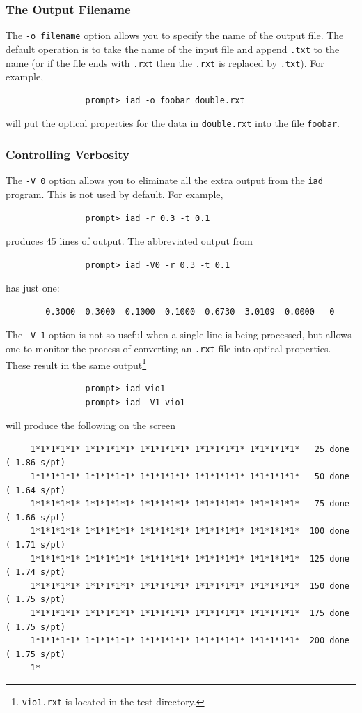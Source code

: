 \documentclass{article}
\newcommand\iadprog{\texttt{iad}}
\begin{document}
\subsubsection{The Output Filename}

The \texttt{-o filename} option allows you to specify the name of the output
file.  The default operation is to take the name of the input file and append
\texttt{.txt} to the name (or if the file ends with \texttt{.rxt} then
the \texttt{.rxt} is replaced by \texttt{.txt}).  For example,
\begin{verbatim}
                prompt> iad -o foobar double.rxt
\end{verbatim}
will put the optical properties for the data in \texttt{double.rxt}
 into the file \texttt{foobar}.

\subsubsection{Controlling Verbosity}

The \texttt{-V 0} option allows you to eliminate all the extra output from
the \iadprog{} program.  This is not used by default. For example,
\begin{verbatim}
                prompt> iad -r 0.3 -t 0.1
\end{verbatim}
produces 45 lines of output.  The abbreviated output from
\begin{verbatim}
                prompt> iad -V0 -r 0.3 -t 0.1
\end{verbatim}
has just one:
\begin{verbatim}
        0.3000  0.3000  0.1000  0.1000  0.6730  3.0109  0.0000   0
\end{verbatim}

The \texttt{-V 1} option is not so useful when a single line
is being processed, but allows one to monitor the process of converting
an \texttt{.rxt} file into optical properties.  These result in the same
output\footnote{\texttt{vio1.rxt} is located in the test directory.}
\begin{verbatim}
                prompt> iad vio1
                prompt> iad -V1 vio1
\end{verbatim}
will produce the following on the screen

{\scriptsize\begin{verbatim}
     1*1*1*1*1* 1*1*1*1*1* 1*1*1*1*1* 1*1*1*1*1* 1*1*1*1*1*   25 done ( 1.86 s/pt)
     1*1*1*1*1* 1*1*1*1*1* 1*1*1*1*1* 1*1*1*1*1* 1*1*1*1*1*   50 done ( 1.64 s/pt)
     1*1*1*1*1* 1*1*1*1*1* 1*1*1*1*1* 1*1*1*1*1* 1*1*1*1*1*   75 done ( 1.66 s/pt)
     1*1*1*1*1* 1*1*1*1*1* 1*1*1*1*1* 1*1*1*1*1* 1*1*1*1*1*  100 done ( 1.71 s/pt)
     1*1*1*1*1* 1*1*1*1*1* 1*1*1*1*1* 1*1*1*1*1* 1*1*1*1*1*  125 done ( 1.74 s/pt)
     1*1*1*1*1* 1*1*1*1*1* 1*1*1*1*1* 1*1*1*1*1* 1*1*1*1*1*  150 done ( 1.75 s/pt)
     1*1*1*1*1* 1*1*1*1*1* 1*1*1*1*1* 1*1*1*1*1* 1*1*1*1*1*  175 done ( 1.75 s/pt)
     1*1*1*1*1* 1*1*1*1*1* 1*1*1*1*1* 1*1*1*1*1* 1*1*1*1*1*  200 done ( 1.75 s/pt)
     1*
\end{verbatim}
}
\end{document}
